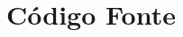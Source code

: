 \documentclass[]{lapesd-thesis}
\begin{document}

\pretextual%

\textual%

\postextual




\chapter{Código Fonte}


\end{document}
